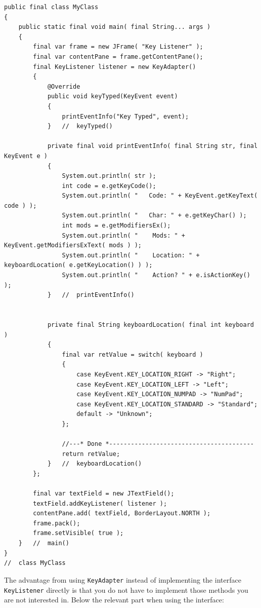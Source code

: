 \documentclass[11pt,a4paper, titlepage, parskip=half, headsepline, footsepline, cleardoublepage=current, headheight=1cm]{scrbook}
\begin{document}
\begin{lstlisting}
public final class MyClass 
{
    public static final void main( final String... args ) 
    {
        final var frame = new JFrame( "Key Listener" );
        final var contentPane = frame.getContentPane();
        final KeyListener listener = new KeyAdapter() 
        {
            @Override
            public void keyTyped(KeyEvent event) 
            {
                printEventInfo("Key Typed", event);
            }	//	keyTyped()
            
            private final void printEventInfo( final String str, final KeyEvent e ) 
            {
                System.out.println( str );
                int code = e.getKeyCode();
                System.out.println( "   Code: " + KeyEvent.getKeyText( code ) );
                System.out.println( "   Char: " + e.getKeyChar() );
                int mods = e.getModifiersEx();
                System.out.println( "    Mods: " + KeyEvent.getModifiersExText( mods ) );
                System.out.println( "    Location: " + keyboardLocation( e.getKeyLocation() ) );
                System.out.println( "    Action? " + e.isActionKey() );
            }   //  printEventInfo()
            
            
            private final String keyboardLocation( final int keyboard ) 
            {
                final var retValue = switch( keyboard ) 
                {
                    case KeyEvent.KEY_LOCATION_RIGHT -> "Right";
                    case KeyEvent.KEY_LOCATION_LEFT -> "Left";
                    case KeyEvent.KEY_LOCATION_NUMPAD -> "NumPad";
                    case KeyEvent.KEY_LOCATION_STANDARD -> "Standard";
                    default -> "Unknown";
                };
                
                //---* Done *----------------------------------------
                return retValue;
            }	//	keyboardLocation()
        };
        
        final var textField = new JTextField();
        textField.addKeyListener( listener );
        contentPane.add( textField, BorderLayout.NORTH );
        frame.pack();
        frame.setVisible( true );
    }   //  main()
}
//  class MyClass
\end{lstlisting}

The advantage from using \lstinline|KeyAdapter| instead of implementing the interface \lstinline|KeyListener| directly is that you do not have to implement those methods you are not interested in. Below the relevant part when using the interface:
\end{document}
